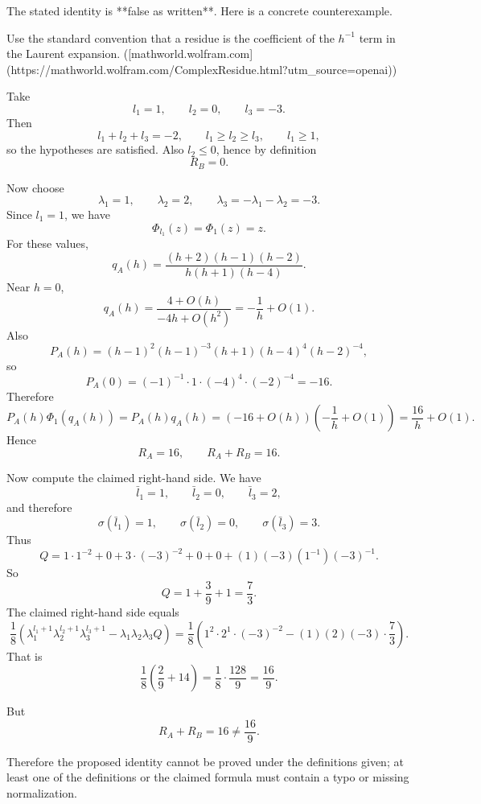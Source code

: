 The stated identity is **false as written**. Here is a concrete counterexample.

Use the standard convention that a residue is the coefficient of the \(h^{-1}\) term in the Laurent expansion. ([mathworld.wolfram.com](https://mathworld.wolfram.com/ComplexResidue.html?utm_source=openai))

Take
\[
l_1=1,\qquad l_2=0,\qquad l_3=-3.
\]
Then
\[
l_1+l_2+l_3=-2,\qquad l_1\ge l_2\ge l_3,\qquad l_1\ge 1,
\]
so the hypotheses are satisfied. Also \(l_2\le 0\), hence by definition
\[
R_B=0.
\]

Now choose
\[
\lambda_1=1,\qquad \lambda_2=2,\qquad \lambda_3=-\lambda_1-\lambda_2=-3.
\]
Since \(l_1=1\), we have
\[
\Phi_{l_1}(z)=\Phi_1(z)=z.
\]
For these values,
\[
q_A(h)=\frac{(h+2)(h-1)(h-2)}{h(h+1)(h-4)}.
\]
Near \(h=0\),
\[
q_A(h)=\frac{4+O(h)}{-4h+O(h^2)}=-\frac1h+O(1).
\]
Also
\[
P_A(h)=(h-1)^2(h-1)^{-3}(h+1)(h-4)^4(h-2)^{-4},
\]
so
\[
P_A(0)=(-1)^{-1}\cdot 1\cdot (-4)^4\cdot (-2)^{-4}=-16.
\]
Therefore
\[
P_A(h)\Phi_1(q_A(h))
=
P_A(h)q_A(h)
=
\left(-16+O(h)\right)\left(-\frac1h+O(1)\right)
=
\frac{16}{h}+O(1).
\]
Hence
\[
R_A=16,
\qquad
R_A+R_B=16.
\]

Now compute the claimed right-hand side. We have
\[
\bar l_1=1,\qquad \bar l_2=0,\qquad \bar l_3=2,
\]
and therefore
\[
\sigma(\bar l_1)=1,\qquad \sigma(\bar l_2)=0,\qquad \sigma(\bar l_3)=3.
\]
Thus
\[
Q
=
1\cdot 1^{-2}
+
0
+
3\cdot (-3)^{-2}
+
0
+
0
+
(1)(-3)(1^{-1})(-3)^{-1}.
\]
So
\[
Q
=
1+\frac{3}{9}+1
=
\frac73.
\]
The claimed right-hand side equals
\[
\frac18\left(
\lambda_1^{l_1+1}\lambda_2^{l_2+1}\lambda_3^{l_3+1}
-
\lambda_1\lambda_2\lambda_3 Q
\right)
=
\frac18\left(
1^2\cdot 2^1\cdot (-3)^{-2}
-
(1)(2)(-3)\cdot \frac73
\right).
\]
That is
\[
\frac18\left(\frac29+14\right)
=
\frac18\cdot \frac{128}{9}
=
\frac{16}{9}.
\]

But
\[
R_A+R_B=16\neq \frac{16}{9}.
\]

Therefore the proposed identity cannot be proved under the definitions given; at least one of the definitions or the claimed formula must contain a typo or missing normalization.